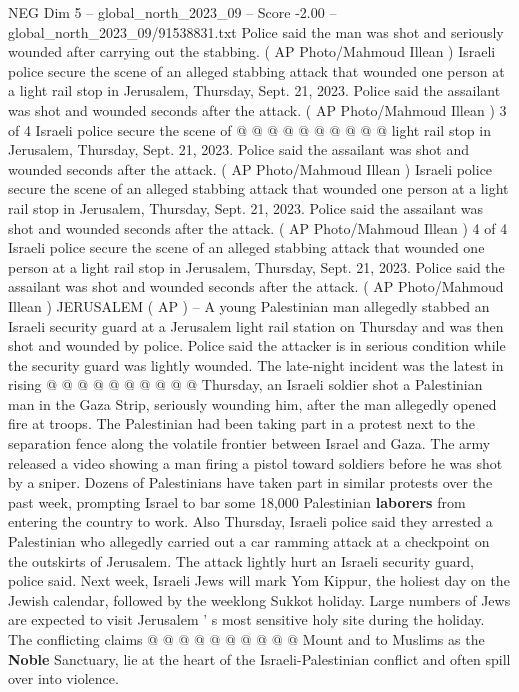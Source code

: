 \begin{textsample}{NEG Dim 5 – global\_north\_2023\_09 – Score -2.00 – global\_north\_2023\_09/91538831.txt}
Police said the man was shot and seriously wounded after carrying out the stabbing. ( AP Photo/Mahmoud Illean ) Israeli police secure the scene of an alleged stabbing attack that wounded one person at a light rail stop in Jerusalem, Thursday, Sept. 21, 2023.
Police said the assailant was shot and wounded seconds after the attack. ( AP Photo/Mahmoud Illean ) 3 of 4 Israeli police secure the scene of @ @ @ @ @ @ @ @ @ @ light rail stop in Jerusalem, Thursday, Sept. 21, 2023.
Police said the assailant was shot and wounded seconds after the attack. ( AP Photo/Mahmoud Illean ) Israeli police secure the scene of an alleged stabbing attack that wounded one person at a light rail stop in Jerusalem, Thursday, Sept. 21, 2023.
Police said the assailant was shot and wounded seconds after the attack. ( AP Photo/Mahmoud Illean ) 4 of 4 Israeli police secure the scene of an alleged stabbing attack that wounded one person at a light rail stop in Jerusalem, Thursday, Sept. 21, 2023.
Police said the assailant was shot and wounded seconds after the attack. ( AP Photo/Mahmoud Illean ) JERUSALEM ( AP ) -- A young Palestinian man allegedly stabbed an Israeli security guard at a Jerusalem light rail station on Thursday and was then shot and wounded by police.
Police said the attacker is in serious condition while the security guard was lightly wounded.
The late-night incident was the latest in rising @ @ @ @ @ @ @ @ @ @ Thursday, an Israeli soldier shot a Palestinian man in the Gaza Strip, seriously wounding him, after the man allegedly opened fire at troops.
The Palestinian had been taking part in a protest next to the separation fence along the volatile frontier between Israel and Gaza.
The army released a video showing a man firing a pistol toward soldiers before he was shot by a sniper.
Dozens of Palestinians have taken part in similar protests over the past week, prompting Israel to bar some 18,000 Palestinian \textbf{laborers} from entering the country to work.
Also Thursday, Israeli police said they arrested a Palestinian who allegedly carried out a car ramming attack at a checkpoint on the outskirts of Jerusalem.
The attack lightly hurt an Israeli security guard, police said.
Next week, Israeli Jews will mark Yom Kippur, the holiest day on the Jewish calendar, followed by the weeklong Sukkot holiday.
Large numbers of Jews are expected to visit Jerusalem ' s most sensitive holy site during the holiday.
The conflicting claims @ @ @ @ @ @ @ @ @ @ Mount and to Muslims as the \textbf{Noble} Sanctuary, lie at the heart of the Israeli-Palestinian conflict and often spill over into violence.

\end{textsample}
